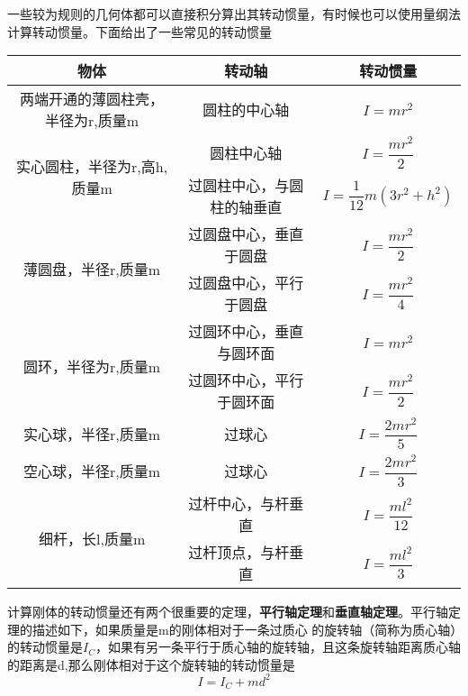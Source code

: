 \documentclass{article}
\begin{document}
    一些较为规则的几何体都可以直接积分算出其转动惯量，有时候也可以使用量纲法计算转动惯量。下面给出了一些常见的转动惯量
    \begin{table}[H]
        \centering
        \begin{tabular}{|c|c|c|}
        \hline
        \textbf{物体}                  & \textbf{转动轴} & \textbf{转动惯量} \\ \hline
        两端开通的薄圆柱壳，半径为r,质量m           & 圆柱的中心轴       &  $I = mr^2$             \\ \hline
        \multirow{2}{*}{实心圆柱，半径为r,高h,质量m}             & 圆柱中心轴        &   $ I=\dfrac{mr^2}{2}$          \\ \cline{2-3}
                                    & 过圆柱中心，与圆柱的轴垂直  &   $ I=\dfrac{1}{12}m(3r^2 + h^2) $   \\ \hline
        \multirow{2}{*}{薄圆盘，半径r,质量m} & 过圆盘中心，垂直于圆盘  &    $ I=\dfrac{mr^2}{2}$           \\ \cline{2-3} 
                                     & 过圆盘中心，平行于圆盘  &       $I=\dfrac{mr^2}{4}$        \\ \hline
        \multirow{2}{*}{圆环，半径为r,质量m} & 过圆环中心，垂直与圆环面 &        $I=mr^2$       \\ \cline{2-3} 
                                     & 过圆环中心，平行于圆环面 &      $I=\dfrac{mr^2}{2}$         \\ \hline
        实心球，半径r,质量m                  & 过球心          &     $I=\dfrac{2mr^2}{5}$          \\ \hline
        空心球，半径r,质量m                  & 过球心          &     $I=\dfrac{2mr^2}{3}$          \\ \hline
        \multirow{2}{*}{细杆，长l,质量m}   & 过杆中心，与杆垂直    &      $I=\dfrac{ml^2}{12}$         \\ \cline{2-3} 
                                     & 过杆顶点，与杆垂直    &     $I=\dfrac{ml^2}{3}$          \\ \hline
        \end{tabular}
    \end{table}

    计算刚体的转动惯量还有两个很重要的定理，\textbf{平行轴定理}和\textbf{垂直轴定理}。平行轴定理的描述如下，如果质量是m的刚体相对于一条过质心
    的旋转轴（简称为质心轴）的转动惯量是\(I_C\)，如果有另一条平行于质心轴的旋转轴，且这条旋转轴距离质心轴的距离是d,那么刚体相对于这个旋转轴的转动惯量是
    \begin{equation*}
        I = I_C + md^2
    \end{equation*}
    
\end{document}
